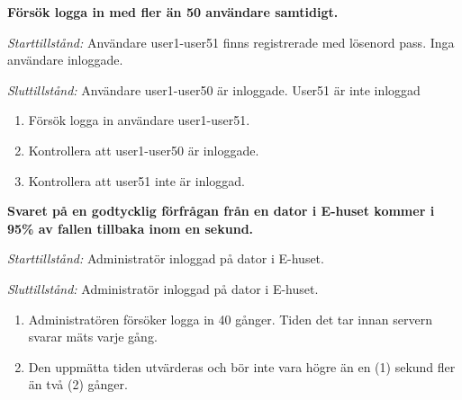 \documentclass[a4paper]{article}
\begin{document}
\begin{ST}
\item
\textbf{Försök logga in med fler än 50 användare samtidigt.}

\emph{Starttillstånd:} Användare user1-user51 finns registrerade med lösenord pass. Inga användare inloggade.

\emph{Sluttillstånd:} Användare user1-user50 är inloggade. User51 är inte inloggad

\begin{enumerate}

\item
Försök logga in användare user1-user51.
\item
Kontrollera att user1-user50 är inloggade.
\item
Kontrollera att user51 inte är inloggad.
\end{enumerate}


%
%
%
%



\item
\textbf{Svaret på en godtycklig förfrågan från en dator i E-huset kommer i 95\% av fallen tillbaka
inom en sekund.}

\emph{Starttillstånd:} Administratör inloggad på dator i E-huset.

\emph{Sluttillstånd:} Administratör inloggad på dator i E-huset.

\begin{enumerate}

\item Administratören försöker logga in 40 gånger. Tiden det tar innan servern svarar mäts varje gång.

\item Den uppmätta tiden utvärderas och bör inte vara högre än en (1) sekund fler än två (2) gånger.


\end{enumerate}

\end{ST}
\end{document}
